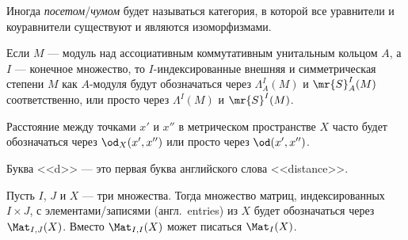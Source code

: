 \documentclass[
	extrafontsizes,
	11pt,
	hyphens,
]{memoir}
\begin{document}

\begin{convention}
Иногда \emph{посетом}/\emph{чумом} будет называться категория, в которой все уравнители и коуравнители существуют и являются изоморфизмами.
\end{convention}

\begin{notation}
Если \(M\) --- модуль над ассоциативным коммутативным унитальным кольцом \(A\), а \(I\) --- конечное множество, то \(I\)-индексированные внешняя и симметрическая степени \(M\) как \(A\)-модуля будут обозначаться через \(\Lambda^I_A(M)\) и \(\mr{S}^I_A(M)\) соответственно, или просто через \(\Lambda^I(M)\) и \(\mr{S}^I(M)\).
\end{notation}

\begin{notation}
Расстояние между точками \(x'\) и \(x''\) в метрическом пространстве \(X\) часто будет обозначаться через \(\od_X(x',x'')\) или просто через \(\od(x',x'')\).
\end{notation}

\begin{remark}
Буква <<\textenglish{d}>> ---  это первая буква английского слова <<\textenglish{distance}>>.
\end{remark}


\begin{notation}
Пусть \(I\), \(J\) и \(X\) --- три множества.
Тогда множество матриц, индексированных \(I \times J\), с элементами/записями (англ.\ \textenglish{entries}) из \(X\) будет обозначаться через \(\Mat_{I,J}(X)\).
Вместо \(\Mat_{I,I}(X)\) может писаться \(\Mat_I(X)\).
\end{notation}
\end{document}

